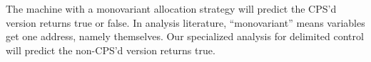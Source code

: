 {\begin{small}
\begin{SCodeFlow}
\begin{RktBlk}
\begin{SingleColumn}
\mbox{}\RktPn{[}\mbox{}\RktPn{(}\RktSym{}\mbox{}\RktPn{(}\mbox{}\RktPn{)}\mbox{}\RktPn{(}\mbox{}\RktPn{(}\mbox{}\RktPn{)}\RktPn{)}\RktPn{)}\RktPn{]}

\mbox{}\RktPn{[}\mbox{}\RktPn{(}\RktSym{}\mbox{}\RktPn{(}\mbox{}\RktPn{)}
\\\mbox{}\RktPn{(}\mbox{}\RktPn{(}\mbox{}\mbox{}\RktPn{(}\RktSym{}\mbox{}\RktPn{(}\RktPn{)}
\\\mbox{}\RktPn{(}\mbox{}\mbox{}\RktPn{(}\RktSym{}\mbox{}\RktPn{(}\RktPn{)}\mbox{}\RktPn{)}\RktPn{)}\RktPn{)}\RktPn{)}\RktPn{)}\RktPn{)}\RktPn{]}\RktPn{)}

\mbox{}\RktPn{(}\mbox{}\mbox{}\RktPn{(}\RktSym{}\mbox{}\RktPn{(}\RktPn{)}\mbox{}\RktPn{(}\mbox{}\mbox{}\RktPn{(}\RktSym{}\mbox{}\RktPn{(}\RktPn{)}\mbox{}\RktPn{(}\RktSym{}\mbox{}\mbox{}\RktPn{)}\RktPn{)}\RktPn{)}\RktPn{)}\RktPn{)}\RktPn{)}\end{SingleColumn}\end{RktBlk}\end{SCodeFlow}
\end{small}
The  machine with a monovariant allocation strategy will predict the CPS'd version returns true or false.
In analysis literature, ``monovariant'' means variables get one address, namely themselves.
Our specialized analysis for delimited control will predict the non-CPS'd version returns true.}


